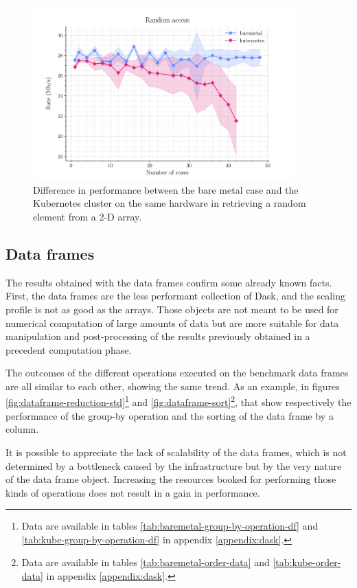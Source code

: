 \begin{figure}
  \centering
  \includegraphics[width=0.9\textwidth]{img/chpt4/array-random-access}
  \caption{Difference in performance between the bare metal case and the
    Kubernetes cluster on the same hardware in retrieving a random element from
    a 2-D array.}
  \label{fig:array-random-access}
\end{figure}

\subsection{Data frames}

The results obtained with the data frames confirm some already known facts.
First, the data frames are the less performant collection of Dask, and the
scaling profile is not as good as the arrays.
Those objects are not meant to be used for numerical computation of large
amounts of data but are more suitable for data manipulation and post-processing
of the results previously obtained in a precedent computation phase.

The outcomes of the different operations executed on the benchmark data frames
are all similar to each other, showing the same trend.
As an example, in figures \ref{fig:dataframe-reduction-std}\footnote{
  Data are available in tables \ref{tab:baremetal-group-by-operation-df} and
  \ref{tab:kube-group-by-operation-df} in appendix \ref{appendix:dask}.
} and \ref{fig:dataframe-sort}\footnote{
  Data are available in tables \ref{tab:baremetal-order-data} and
  \ref{tab:kube-order-data} in appendix \ref{appendix:dask}.
}, that show respectively the performance of the group-by operation and the
sorting of the data frame by a column.

It is possible to appreciate the lack of scalability of the data frames, which
is not determined by a bottleneck caused by the infrastructure but by the very
nature of the data frame object.
Increasing the resources booked for performing those kinds of operations does
not result in a gain in performance.

